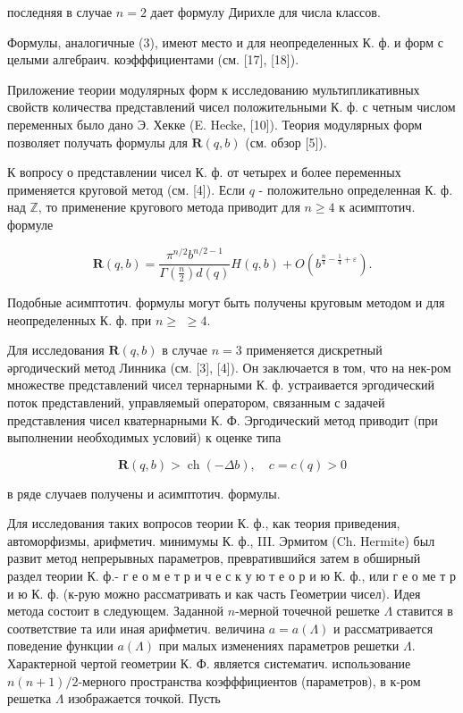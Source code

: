 \documentclass[10pt]{article}
\begin{document}
последняя в случае $n=2$ дает формулу Дирихле для числа классов.



Формулы, аналогичные (3), имеют место и для неопределенных К. ф. и форм с целыми алгебраич. коэфффициентами (см. [17], [18]).



Приложение теории модулярных форм к исследованию мультипликативных свойств количества представлений чисел положительными К. ф. с четным числом переменных было дано Э. Хекке (E. Hecke, [10]). Теория модулярных форм позволяет получать формулы для $\boldsymbol{R}(q, b)$ (см. обзор [5]).



К вопросу о представлении чисел К. ф. от четырех и более переменных применяется круговой метод (см. [4]). Если $q$ - положительно определенная К. ф. над $\mathbb{Z}$, то применение кругового метода приводит для $n \geqslant 4$ к асимптотич. формуле



\[

\boldsymbol{R}(q, b)=\frac{\pi^{n / 2} b^{n / 2-1}}{\Gamma\left(\frac{n}{2}\right) d(q)} H(q, b)+O\left(b^{\frac{n}{4}-\frac{1}{4}+\varepsilon}\right) .

\]



Подобные асимптотич. формулы могут быть получены круговым методом и для неопределенных К. ф. при $n \geqslant$ $\geqslant 4$.



Для исследования $\boldsymbol{R}(q, b)$ в случае $n=3$ применяется дискретный әргодический метод Линника (см. [3], [4]). Он заключается в том, что на нек-ром множестве представлений чисел тернарными К. ф. устраивается эргодический поток представлений, управляемый оператором, связанным с задачей представления чисел кватернарными К. Ф. Эргодический метод приводит (при выполнении необходимых условий) к оценке типа



\[

\boldsymbol{R}(q, b)>\operatorname{ch}(-\Delta b), \quad c=c(q)>0

\]



в ряде случаев получены и асимптотич. формулы.



Для исследования таких вопросов теории К. ф., как теория приведения, автоморфизмы, арифметич. минимумы К. ф., III. Эрмитом (Ch. Hermite) был развит метод непрерывных параметров, превратившийся затем в обширный раздел теории К. ф.- г е о м е т р и ч е с к у ю т е о р и ю К. ф., или г е о ме т р и ю К. ф. (к-рую можно рассматривать и как часть Геометрии чисел). Идея метода состоит в следующем. Заданной $n$-мерной точечной решетке $\Lambda$ ставится в соответствие та или иная арифметич. величина $a=a(\Lambda)$ и рассматривается поведение функции $a(\Lambda)$ при малых изменениях параметров решетки $\Lambda$. Характерной чертой геометрии К. Ф. является систематич. использование $n(n+1) / 2$-мерного пространства коэфффициентов (параметров), в к-ром решетка $\Lambda$ изображается точкой. Пусть
\end{document}
